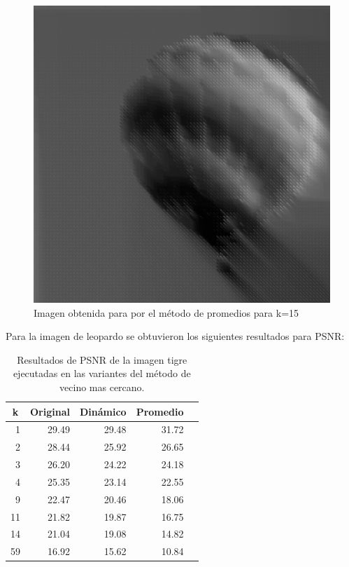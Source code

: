 \documentclass[a4paper]{article}
\newcounter{col}
\begin{document}
\begin{figure}[H]
\centering
\includegraphics[scale=0.15]{imagenes/globok15.png}
\caption{Imagen obtenida para por el método de promedios para k=15}
\label{globoProm}
\end{figure}


Para la imagen de leopardo se obtuvieron los siguientes resultados para PSNR:


\begin{table}[H]
\centering
\begin{tabular}{|r|r|r|r|r|}
\hline
\multicolumn{1}{|c|}{k} & \multicolumn{1}{c|}{Original} & \multicolumn{1}{c|}{Dinámico} & \multicolumn{1}{c|}{Promedio} \\ \hline
1 & 29.49 & 29.48& 31.72 \\ \hline
2 & 28.44 &  25.92 & 26.65 \\ \hline
3 & 26.20 &  24.22 & 24.18 \\ \hline
4 &25.35&  23.14 &  22.55 \\ \hline
9 & 22.47 & 20.46& 18.06 \\ \hline
11 & 21.82 &   19.87 & 16.75 \\ \hline
14 & 21.04 &  19.08 &  14.82 \\ \hline
59 &16.92&  15.62 & 10.84 \\ \hline
\end{tabular}
\caption{Resultados de PSNR de la imagen tigre ejecutadas en las variantes del m\'etodo de vecino mas cercano.}
\label{}
\end{table}
\end{document}
